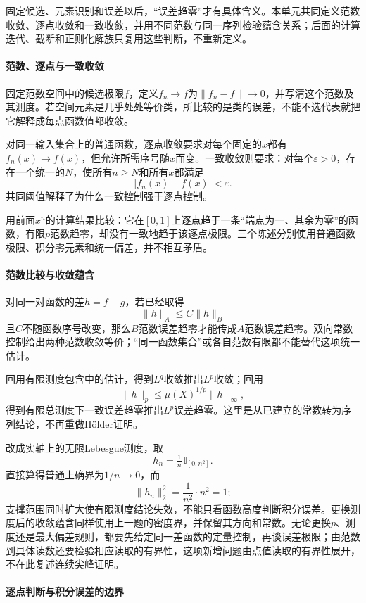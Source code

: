 固定候选、元素识别和误差以后，“误差趋零”才有具体含义。本单元共同定义范数收敛、逐点收敛和一致收敛，并用不同范数与同一序列检验蕴含关系；后面的计算迭代、截断和正则化解族只复用这些判断，不重新定义。

\paragraph{范数、逐点与一致收敛}

固定范数空间中的候选极限$f$，定义$f_n\to f$为$\|f_n-f\|\to0$，并写清这个范数及其测度。若空间元素是几乎处处等价类，所比较的是类的误差，不能不选代表就把它解释成每点函数值都收敛。

对同一输入集合上的普通函数，逐点收敛要求对每个固定的$x$都有$f_n(x)\to f(x)$，但允许所需序号随$x$而变。一致收敛则要求：对每个$\varepsilon>0$，存在一个统一的$N$，使所有$n\ge N$和所有$x$都满足
\[
  |f_n(x)-f(x)|<\varepsilon.
\]
共同阈值解释了为什么一致控制强于逐点控制。

用前面$x^n$的计算结果比较：它在$[0,1]$上逐点趋于一条“端点为一、其余为零”的函数，有限$p$范数趋零，却没有一致地趋于该逐点极限。三个陈述分别使用普通函数极限、积分零元素和统一偏差，并不相互矛盾。

\paragraph{范数比较与收敛蕴含}

对同一对函数的差$h=f-g$，若已经取得
\[
  \|h\|_A\le C\|h\|_B
\]
且$C$不随函数序号改变，那么$B$范数误差趋零才能传成$A$范数误差趋零。双向常数控制给出两种范数收敛等价；“同一函数集合”或各自范数有限都不能替代这项统一估计。

回用有限测度包含中的估计，得到$L^q$收敛推出$L^p$收敛；回用
\[
  \|h\|_p\le\mu(X)^{1/p}\|h\|_\infty,
\]
得到有限总测度下一致误差趋零推出$L^p$误差趋零。这里是从已建立的常数转为序列结论，不再重做Hölder证明。

改成实轴上的无限Lebesgue测度，取
\[
  h_n=\tfrac1n\,\mathbb I_{[0,n^2]}.
\]
直接算得普通上确界为$1/n\to0$，而
\[
  \|h_n\|_2^2=\frac{1}{n^2}\cdot n^2=1;
\]
支撑范围同时扩大使有限测度结论失效，不能只看函数高度判断积分误差。更换测度后的收敛蕴含同样使用上一题的密度界，并保留其方向和常数。无论更换$p$、测度还是最大偏差规则，都要先给定同一差函数的定量控制，再谈误差极限；由范数到具体读数还要检验相应读取的有界性，这项新增问题由点值读取的有界性展开，不在此复述连续尖峰证明。

\paragraph{逐点判断与积分误差的边界}

